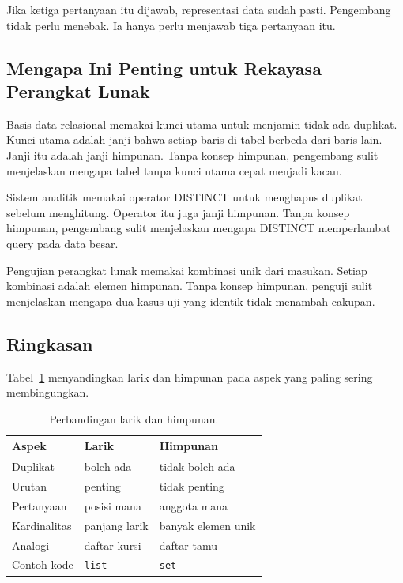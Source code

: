 \documentclass[11pt,a4paper]{article}
\begin{document}
Jika ketiga pertanyaan itu dijawab, representasi data sudah pasti. Pengembang tidak perlu menebak. Ia hanya perlu menjawab tiga pertanyaan itu.

\subsection{Mengapa Ini Penting untuk Rekayasa Perangkat Lunak}

Basis data relasional memakai kunci utama untuk menjamin tidak ada duplikat. Kunci utama adalah janji bahwa setiap baris di tabel berbeda dari baris lain. Janji itu adalah janji himpunan. Tanpa konsep himpunan, pengembang sulit menjelaskan mengapa tabel tanpa kunci utama cepat menjadi kacau.

Sistem analitik memakai operator DISTINCT untuk menghapus duplikat sebelum menghitung. Operator itu juga janji himpunan. Tanpa konsep himpunan, pengembang sulit menjelaskan mengapa DISTINCT memperlambat query pada data besar.

Pengujian perangkat lunak memakai kombinasi unik dari masukan. Setiap kombinasi adalah elemen himpunan. Tanpa konsep himpunan, penguji sulit menjelaskan mengapa dua kasus uji yang identik tidak menambah cakupan.

\subsection{Ringkasan}

Tabel~\ref{tab:larik-himpunan} menyandingkan larik dan himpunan pada aspek yang paling sering membingungkan.

\begin{table}[H]
	\centering
	\caption{Perbandingan larik dan himpunan.}
	\label{tab:larik-himpunan}
	\small
	\begin{tabularx}{\textwidth}{l X X}
		\toprule
		Aspek & Larik & Himpunan \\
		\midrule
		Duplikat & boleh ada & tidak boleh ada \\
		Urutan & penting & tidak penting \\
		Pertanyaan & posisi mana & anggota mana \\
		Kardinalitas & panjang larik & banyak elemen unik \\
		Analogi & daftar kursi & daftar tamu \\
		Contoh kode & \texttt{list} & \texttt{set} \\
		\bottomrule
	\end{tabularx}
\end{table}
\end{document}
